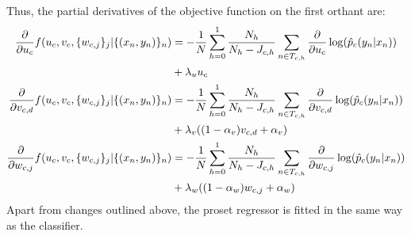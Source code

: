 %
Thus, the partial derivatives of the objective function on the first orthant are:
%
\begin{align}
\frac{\partial}{\partial u_c}f(u_c,v_c,\{w_{c,j}\}_j|\{(x_n,y_n)\}_n)&=
-\frac{1}{N}\sum_{h=0}^1\frac{N_h}{N_h-J_{c,h}}\sum_{n\in T_{c,h}}\frac{\partial}{\partial u_c}\log(\hat{p}_c(y_n|x_n))
\label{eq_l_partial_u_reg}\\
&+\lambda_uu_c\notag\\
\frac{\partial}{\partial v_{c,d}}f(u_c,v_c,\{w_{c,j}\}_j|\{(x_n,y_n)\}_n)&=
-\frac{1}{N}\sum_{h=0}^1\frac{N_h}{N_h-J_{c,h}}\sum_{n\in T_{c,h}}\frac{\partial}{\partial v_{c,d}}\log(\hat{p}_c(y_n|x_n))
\label{eq_l_partial_v_reg}\\
&+\lambda_v((1-\alpha_v)v_{c,d}+\alpha_v)\notag\\
\frac{\partial}{\partial w_{c,j}}f(u_c,v_c,\{w_{c,j}\}_j|\{(x_n,y_n)\}_n)&=
-\frac{1}{N}\sum_{h=0}^1\frac{N_h}{N_h-J_{c,h}}\sum_{n\in T_{c,h}}\frac{\partial}{\partial w_{c,j}}\log(\hat{p}_c(y_n|x_n))
\label{eq_l_partial_w_reg}\\
&+\lambda_w((1-\alpha_w)w_{c,j}+\alpha_w)\notag
\end{align}
%
Apart from changes outlined above, the proset regressor is fitted in the same way as the classifier.
%
